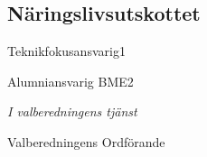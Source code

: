 \documentclass[../_main/handlingar.tex]{subfiles}
\begin{document}



\subsection*{Näringslivsutskottet}
\begin{vallista}
    
    

    \begin{post}{Teknikfokusansvarig}{1}
        \end{post}

   
        \begin{post}{Alumniansvarig BME}{2}
            \vakant
        \end{post}

\end{vallista}

\begin{signatures}{1}
\emph{I valberedningens tjänst}
\signature{Axel Voss}{Valberedningens Ordförande}
\end{signatures}
\end{document}
